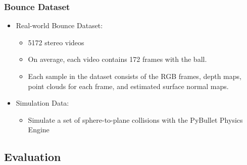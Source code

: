 \documentclass{article}
\begin{document}
    \subsubsection{Bounce Dataset}\label{subsubsec:Bounce_and_Learn_Modeling_Scene_Dynamics_with_Real_World_Bounces_(ICLR_2019,_CMU):bounce-dataset}
    \begin{itemize}
        \item Real-world Bounce Dataset:
        \begin{itemize}
            \item 5172 stereo videos
            \item On average, each video contains 172 frames with the ball.
            \item Each sample in the dataset consists of the RGB frames, depth maps, point clouds for each frame, and estimated surface normal maps.
        \end{itemize}
        \item Simulation Data:
        \begin{itemize}
            \item Simulate a set of sphere-to-plane collisions with the PyBullet Physics Engine
        \end{itemize}
    \end{itemize}

    \subsection{Evaluation}\label{subsec:Bounce_and_Learn_Modeling_Scene_Dynamics_with_Real_World_Bounces_(ICLR_2019,_CMU):evaluation}
\end{document}

